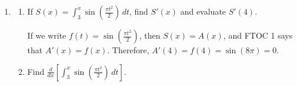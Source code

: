 \documentclass[main]{subfiles}
\begin{document}
\begin{enumerate}[resume]
\begin{enumerate}
\begin{enumerate}
\begin{solution}
      The key is that we know one $x$-intercept of $B(x)$, $x = 1$. So,
      to get the graph of $B(x)$, we shift the graph of $A(x)$
      up or down until it hits the $x$-axis at $x = 1$.  In this case, we
      must shift it down:
      \begin{center}
      \end{center}
      From the graphs, we can see that the amount we had to shift $A$
      down to get $B$ was exactly $A(1)$.  Since we found that
      $A(x) = \arctan x$, $A(1) = \arctan(1) = \frac{\pi}{4}$.
      So, we can conclude that $B(x) = A(x) - \frac{\pi}{4}$. 
    \end{solution}
    \end{enumerate}

  \end{enumerate}

\item 

  \begin{enumerate}
  \item
    \begin{problem}[\stretch{0.5}]
      If $S(x) = \displaystyle \int_3^x \sin \left( \frac{\pi t^2}{2}
      \right)\,dt$, find $S'(x)$ and evaluate $S'(4)$.
    \end{problem}

    \begin{solution}
      If we write $\displaystyle f(t) = \sin \left( \frac{\pi
            t^2}{2} \right)$, then $S(x) = A(x)$, and FTOC 1 says
        that $A'(x) = f(x)$.  Therefore, $A'(4) = f(4) =
        \sin(8 \pi) = \boxed{0}$.
    \end{solution}

  \item
    \begin{problem}[\stretch{0.5}]
      Find $\displaystyle \frac{d}{dx} \left[ \int_3^x \sin \left(
          \frac{\pi t^2}{2} \right)\,dt \right]$. 
    \end{problem}


\end{enumerate}
\end{enumerate}
\end{document}

